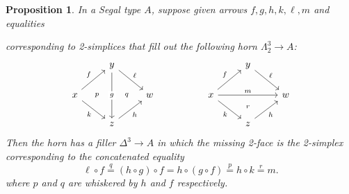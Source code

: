 \documentclass[12pt]{amsart}
\theoremstyle{plain}
\newtheorem{prop}[thm]{Proposition}
\theoremstyle{definition}
\theoremstyle{remark}
\numberwithin{equation}{section}
\begin{document}
\begin{prop}\label{thm:32horn-concat}
  In a Segal type $A$, suppose given arrows $f,g,h,k,\ell,m$ and equalities
  corresponding to 2-simplices that fill out the following horn $\Lambda^3_2 \to A$:
  \[
  \begin{tikzcd}
    & y \ar[dd,"g" description] \ar[dr,"\ell"] &&&& y \ar[dr,"\ell"] \\
    x \ar[ur,"f"] \ar[dr,"k"'] \ar[rr,phantom,"\scriptstyle p" near start, "\scriptstyle q" near end] && w && x \ar[ur,"f"] \ar[dr,"k"'] \ar[rr,"m"] && w \\
    & z \ar[ur,"h"'] &&&& z \ar[ur,"h"'] \ar[uu,phantom,"\scriptstyle r" near start]
  \end{tikzcd}
  \]
  Then the horn has a filler $\Delta^3 \to A$ in which the missing 2-face is the 2-simplex corresponding to the concatenated equality
  \begin{equation}\label{eq:32horn-concat}
    \ell \circ f \overset q= (h\circ g) \circ f
    = h \circ (g\circ f)
    \overset p= h\circ k
    \overset r= m.
  \end{equation}
  where $p$ and $q$ are whiskered by $h$ and $f$ respectively.
\end{prop}
\end{document}
